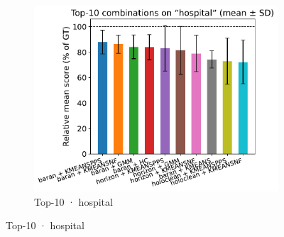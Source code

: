 \documentclass[10pt]{article} %
\numberwithin{equation}{section}
\begin{document}
\begin{figure}[htbp]
  \begin{subfigure}{0.34\linewidth}
    \centering
    \includegraphics[width=\linewidth]{figures/5.3.1graph/top10_bar_error_hospital.pdf}
    \caption{Top-10 · hospital}
  \end{subfigure}


\end{figure}
\end{document}
